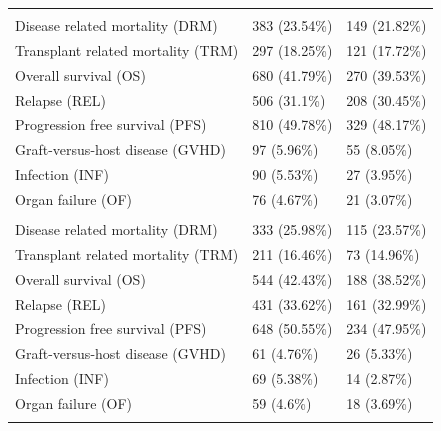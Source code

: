 \documentclass[]{DissertateOSU}
\begin{document}
\begin{table}[t]
\begin{tabular}{lll}
\addlinespace[.5em]
\multicolumn{3}{l}{\textbf{AML + MDS }}\\
\hspace{1em}Disease related mortality (DRM) & 383 (23.54\%) & 149 (21.82\%)\\
\hspace{1em}Transplant related mortality (TRM) & 297 (18.25\%) & 121 (17.72\%)\\
\hspace{1em}Overall survival (OS) & 680 (41.79\%) & 270 (39.53\%)\\
\hspace{1em}Relapse (REL) & 506 (31.1\%) & 208 (30.45\%)\\
\hspace{1em}Progression free survival (PFS) & 810 (49.78\%) & 329 (48.17\%)\\
\hspace{1em}Graft-versus-host disease (GVHD) & 97 (5.96\%) & 55 (8.05\%)\\
\hspace{1em}Infection (INF) & 90 (5.53\%) & 27 (3.95\%)\\
\hspace{1em}Organ failure (OF) & 76 (4.67\%) & 21 (3.07\%)\\
\addlinespace[.5em]
\multicolumn{3}{l}{\textbf{AML Only}}\\
\hspace{1em}Disease related mortality (DRM) & 333 (25.98\%) & 115 (23.57\%)\\
\hspace{1em}Transplant related mortality (TRM) & 211 (16.46\%) & 73 (14.96\%)\\
\hspace{1em}Overall survival (OS) & 544 (42.43\%) & 188 (38.52\%)\\
\hspace{1em}Relapse (REL) & 431 (33.62\%) & 161 (32.99\%)\\
\hspace{1em}Progression free survival (PFS) & 648 (50.55\%) & 234 (47.95\%)\\
\hspace{1em}Graft-versus-host disease (GVHD) & 61 (4.76\%) & 26 (5.33\%)\\
\hspace{1em}Infection (INF) & 69 (5.38\%) & 14 (2.87\%)\\
\hspace{1em}Organ failure (OF) & 59 (4.6\%) & 18 (3.69\%)\\
\addlinespace[.5em]

\end{tabular}
\end{table}
\end{document}
